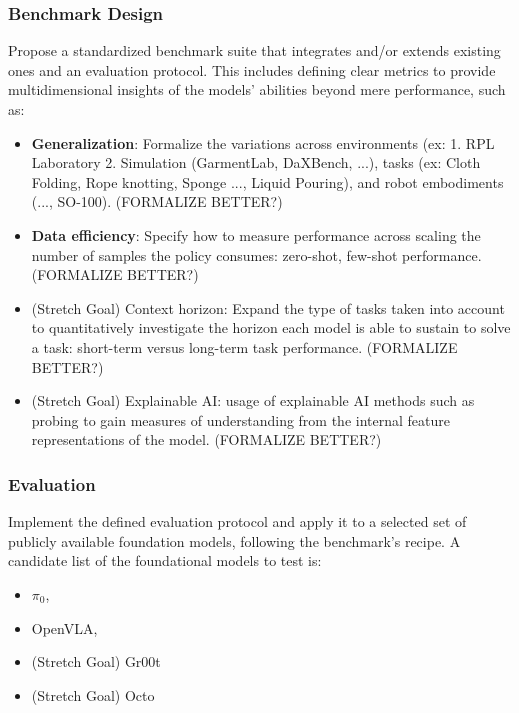     \subsubsection{Benchmark Design}
        Propose a standardized benchmark suite that integrates and/or extends existing ones and an evaluation protocol. This includes defining clear metrics to provide multidimensional insights of the models' abilities beyond mere performance, such as:
        \begin{itemize}
            \item \textbf{Generalization}: Formalize the variations across environments (ex: 1. RPL Laboratory 2. Simulation (GarmentLab, DaXBench, ...), tasks (ex: Cloth Folding, Rope knotting, Sponge ..., Liquid Pouring), and robot embodiments (..., SO-100). (FORMALIZE BETTER?)
            \item \textbf{Data efficiency}: Specify how to measure performance across scaling the number of samples the policy consumes: zero-shot, few-shot performance. (FORMALIZE BETTER?)
            \item (Stretch Goal) Context horizon: Expand the type of tasks taken into account to quantitatively investigate the horizon each model is able to sustain to solve a task: short-term versus long-term task performance. (FORMALIZE BETTER?)
            \item (Stretch Goal) Explainable AI: usage of explainable AI methods such as probing \cite{Probing-VLA} to gain measures of understanding from the internal feature representations of the model. (FORMALIZE BETTER?)
        \end{itemize}

    \subsubsection{Evaluation}
        Implement the defined evaluation protocol and apply it to a selected set of publicly available foundation models, following the benchmark's recipe. A candidate list of the foundational models to test is:
        \begin{itemize}
            \item $\pi_0$, \cite{pi_zero}
            \item OpenVLA, \cite{OpenVLA}
            \item (Stretch Goal) Gr00t \cite{Gr00tN1}
            \item (Stretch Goal) Octo \cite{Octo}
        \end{itemize}
        


